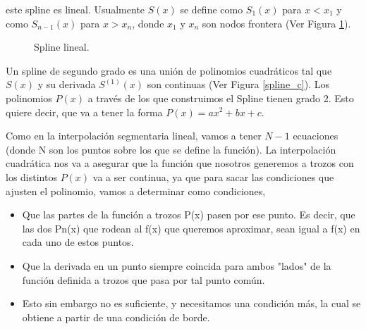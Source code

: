 \vspace{0.5cm}

\noindent este spline es lineal. Usualmente $S(x)$ se define como $S_{1}(x)$ para $x<x_{1}$ y como $S_{n-1}(x)$ para $x>x_{n}$, donde $x_{1}$ y $x_{n}$ son nodos frontera (Ver Figura \ref{spline_l}).


\begin{figure}[h]
\caption{Spline lineal.}
\label{spline_l}
\end{figure}


\hspace{0.4cm} Un spline de segundo grado es una uni\'on de polinomios cuadr\'aticos tal que $S(x)$ y su derivada $S^{(1)}(x)$ son continuas (Ver Figura \ref{spline_c}). Los polinomios $P(x)$ a trav\'es de los que construimos el Spline tienen grado 2. Esto quiere decir, que va a tener la forma $P(x) = ax^2 + bx + c$.

\hspace{0.4cm} Como en la interpolaci\'on segmentaria lineal, vamos a tener $N-1$ ecuaciones (donde N son los puntos sobre los que se define la funci\'on). La interpolaci\'on cuadr\'atica nos va a asegurar que la funci\'on que nosotros generemos a trozos con los distintos $P(x)$ va a ser continua, ya que para sacar las condiciones que ajusten el polinomio, vamos a determinar como condiciones,

\begin{itemize}
  \item Que las partes de la funci\'on a trozos P(x) pasen por ese punto. Es decir, que las dos Pn(x) que rodean al f(x) que queremos aproximar, sean igual a f(x) en cada uno de estos puntos.
  \item Que la derivada en un punto siempre coincida para ambos "lados" de la funci\'on definida a trozos que pasa por tal punto com\'un.
  \item Esto sin embargo no es suficiente, y necesitamos una condici\'on m\'as, la cual se obtiene a partir de una condici\'on de borde.
\end{itemize}




